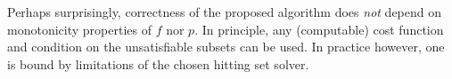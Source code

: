 \documentclass[twoside,11pt]{article}
\newcommand\m[1]{\mathcal{#1}}
\newcommand\comment[1]{\marginpar{\tiny #1}}
\renewcommand\comment[1]{#1}
\newcommand{\tias}[1]{{\comment{\color{blue}Tias:#1}}}
\newcommand{\bart}[1]{{\comment{\color{OliveGreen}Bart: #1}}}
\newcommand\subsetT{\ensuremath{\m{S} }\xspace}
\newcommand\Iend{\ensuremath{I_\mathit{end} }\xspace}
\newcommand\formula{\ensuremath{\m{F} }\xspace}
\newcommand\mm[1]{\ensuremath{#1}\xspace}
\newcommand\call[1]{\mm{\texttt{#1}}}
\newcommand\grow{\mm{\call{Grow}}}
\newcommand\corrsubsets{\mm{\call{CorrSubsets}}}
\newcommand\onestep{\ensuremath{\call{Explain-One-Step}}\xspace}
\begin{document}
Perhaps surprisingly, correctness of the proposed algorithm does \emph{not} depend on monotonicity properties of $f$ nor $p$. In principle, any (computable) cost function and condition on the unsatisfiable subsets can be used. In practice however, one is bound by limitations of the chosen hitting set solver.
	


%


\end{document}
